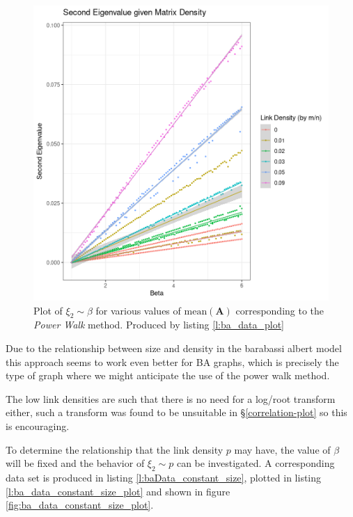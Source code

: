 \documentclass[11pt]{report}
\begin{document}
\begin{figure}[htbp]
\centering
\includegraphics[width=12cm]{media/constant_dens_ba_density_sqrt.png}
\caption{\label{fig:ba_data_plot} Plot of \(\xi_{2}\sim \beta\) for various values of \(\mathrm{mean}\left(\mathbf{A}\right)\) corresponding to the \textit{Power Walk} method. Produced by listing \ref{l:ba_data_plot} }
\end{figure}

Due to the relationship between size and density in the barabassi albert model this approach seems to work even better for BA graphs, which is precisely the type of graph where we might anticipate the use of the power walk method.

The low link densities are such that there is no need for a log/root transform either, such a transform was found to be unsuitable in \S \ref{correlation-plot} so this is encouraging.

To determine the relationship that the link density \(p\) may have, the value of
\(\beta\) will be fixed and the behavior of \(\xi_{2} \sim p\) can be
investigated. A corresponding data set is produced in listing
\ref{l:baData_constant_size}, plotted in listing \ref{l:ba_data_constant_size_plot} and
shown in figure \ref{fig:ba_data_constant_size_plot}.
\end{document}
